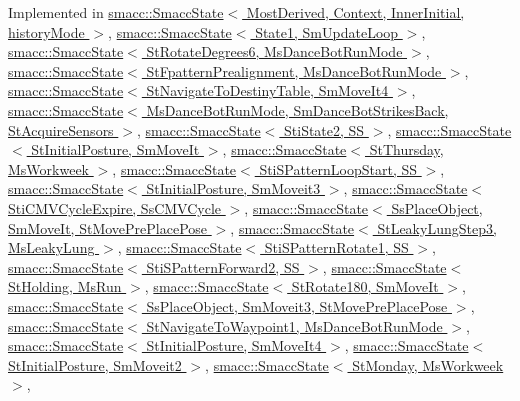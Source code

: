 Implemented in \hyperlink{classsmacc_1_1SmaccState_afc39f8e0ca4001b2159a100da2fccd0e}{smacc\+::\+Smacc\+State$<$ Most\+Derived, Context, Inner\+Initial, history\+Mode $>$}, \hyperlink{classsmacc_1_1SmaccState_afc39f8e0ca4001b2159a100da2fccd0e}{smacc\+::\+Smacc\+State$<$ State1, Sm\+Update\+Loop $>$}, \hyperlink{classsmacc_1_1SmaccState_afc39f8e0ca4001b2159a100da2fccd0e}{smacc\+::\+Smacc\+State$<$ St\+Rotate\+Degrees6, Ms\+Dance\+Bot\+Run\+Mode $>$}, \hyperlink{classsmacc_1_1SmaccState_afc39f8e0ca4001b2159a100da2fccd0e}{smacc\+::\+Smacc\+State$<$ St\+Fpattern\+Prealignment, Ms\+Dance\+Bot\+Run\+Mode $>$}, \hyperlink{classsmacc_1_1SmaccState_afc39f8e0ca4001b2159a100da2fccd0e}{smacc\+::\+Smacc\+State$<$ St\+Navigate\+To\+Destiny\+Table, Sm\+Move\+It4 $>$}, \hyperlink{classsmacc_1_1SmaccState_afc39f8e0ca4001b2159a100da2fccd0e}{smacc\+::\+Smacc\+State$<$ Ms\+Dance\+Bot\+Run\+Mode, Sm\+Dance\+Bot\+Strikes\+Back, St\+Acquire\+Sensors $>$}, \hyperlink{classsmacc_1_1SmaccState_afc39f8e0ca4001b2159a100da2fccd0e}{smacc\+::\+Smacc\+State$<$ Sti\+State2, S\+S $>$}, \hyperlink{classsmacc_1_1SmaccState_afc39f8e0ca4001b2159a100da2fccd0e}{smacc\+::\+Smacc\+State$<$ St\+Initial\+Posture, Sm\+Move\+It $>$}, \hyperlink{classsmacc_1_1SmaccState_afc39f8e0ca4001b2159a100da2fccd0e}{smacc\+::\+Smacc\+State$<$ St\+Thursday, Ms\+Workweek $>$}, \hyperlink{classsmacc_1_1SmaccState_afc39f8e0ca4001b2159a100da2fccd0e}{smacc\+::\+Smacc\+State$<$ Sti\+S\+Pattern\+Loop\+Start, S\+S $>$}, \hyperlink{classsmacc_1_1SmaccState_afc39f8e0ca4001b2159a100da2fccd0e}{smacc\+::\+Smacc\+State$<$ St\+Initial\+Posture, Sm\+Moveit3 $>$}, \hyperlink{classsmacc_1_1SmaccState_afc39f8e0ca4001b2159a100da2fccd0e}{smacc\+::\+Smacc\+State$<$ Sti\+C\+M\+V\+Cycle\+Expire, Ss\+C\+M\+V\+Cycle $>$}, \hyperlink{classsmacc_1_1SmaccState_afc39f8e0ca4001b2159a100da2fccd0e}{smacc\+::\+Smacc\+State$<$ Ss\+Place\+Object, Sm\+Move\+It, St\+Move\+Pre\+Place\+Pose $>$}, \hyperlink{classsmacc_1_1SmaccState_afc39f8e0ca4001b2159a100da2fccd0e}{smacc\+::\+Smacc\+State$<$ St\+Leaky\+Lung\+Step3, Ms\+Leaky\+Lung $>$}, \hyperlink{classsmacc_1_1SmaccState_afc39f8e0ca4001b2159a100da2fccd0e}{smacc\+::\+Smacc\+State$<$ Sti\+S\+Pattern\+Rotate1, S\+S $>$}, \hyperlink{classsmacc_1_1SmaccState_afc39f8e0ca4001b2159a100da2fccd0e}{smacc\+::\+Smacc\+State$<$ Sti\+S\+Pattern\+Forward2, S\+S $>$}, \hyperlink{classsmacc_1_1SmaccState_afc39f8e0ca4001b2159a100da2fccd0e}{smacc\+::\+Smacc\+State$<$ St\+Holding, Ms\+Run $>$}, \hyperlink{classsmacc_1_1SmaccState_afc39f8e0ca4001b2159a100da2fccd0e}{smacc\+::\+Smacc\+State$<$ St\+Rotate180, Sm\+Move\+It $>$}, \hyperlink{classsmacc_1_1SmaccState_afc39f8e0ca4001b2159a100da2fccd0e}{smacc\+::\+Smacc\+State$<$ Ss\+Place\+Object, Sm\+Moveit3, St\+Move\+Pre\+Place\+Pose $>$}, \hyperlink{classsmacc_1_1SmaccState_afc39f8e0ca4001b2159a100da2fccd0e}{smacc\+::\+Smacc\+State$<$ St\+Navigate\+To\+Waypoint1, Ms\+Dance\+Bot\+Run\+Mode $>$}, \hyperlink{classsmacc_1_1SmaccState_afc39f8e0ca4001b2159a100da2fccd0e}{smacc\+::\+Smacc\+State$<$ St\+Initial\+Posture, Sm\+Move\+It4 $>$}, \hyperlink{classsmacc_1_1SmaccState_afc39f8e0ca4001b2159a100da2fccd0e}{smacc\+::\+Smacc\+State$<$ St\+Initial\+Posture, Sm\+Moveit2 $>$}, \hyperlink{classsmacc_1_1SmaccState_afc39f8e0ca4001b2159a100da2fccd0e}{smacc\+::\+Smacc\+State$<$ St\+Monday, Ms\+Workweek $>$}, 